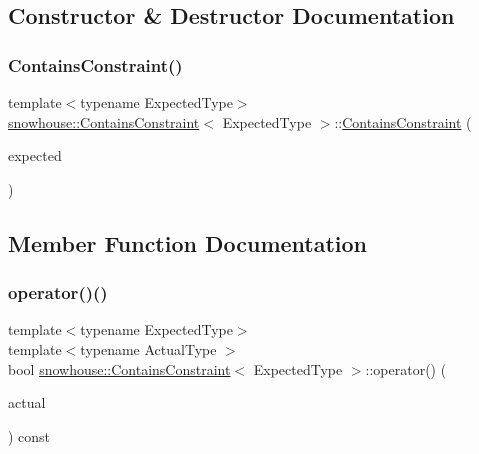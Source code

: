 \subsection{Constructor \& Destructor Documentation}
\mbox{\label{structsnowhouse_1_1ContainsConstraint_a090933abc6ca69daeb0027c5d1b9bfb1}} 
\subsubsection{\texorpdfstring{ContainsConstraint()}{ContainsConstraint()}}
{\footnotesize\ttfamily template$<$typename Expected\+Type$>$ \\
\mbox{\hyperlink{structsnowhouse_1_1ContainsConstraint}{snowhouse\+::\+Contains\+Constraint}}$<$ Expected\+Type $>$\+::\mbox{\hyperlink{structsnowhouse_1_1ContainsConstraint}{Contains\+Constraint}} (\begin{DoxyParamCaption}\item[{const Expected\+Type \&}]{expected }\end{DoxyParamCaption})\hspace{0.3cm}{\ttfamily [inline]}}



\subsection{Member Function Documentation}
\mbox{\label{structsnowhouse_1_1ContainsConstraint_a019dd604cbe08be692fa05e7f9ffded0}} 
\subsubsection{\texorpdfstring{operator()()}{operator()()}\hspace{0.1cm}{\footnotesize\ttfamily [1/2]}}
{\footnotesize\ttfamily template$<$typename Expected\+Type$>$ \\
template$<$typename Actual\+Type $>$ \\
bool \mbox{\hyperlink{structsnowhouse_1_1ContainsConstraint}{snowhouse\+::\+Contains\+Constraint}}$<$ Expected\+Type $>$\+::operator() (\begin{DoxyParamCaption}\item[{const Actual\+Type \&}]{actual }\end{DoxyParamCaption}) const\hspace{0.3cm}{\ttfamily [inline]}}

